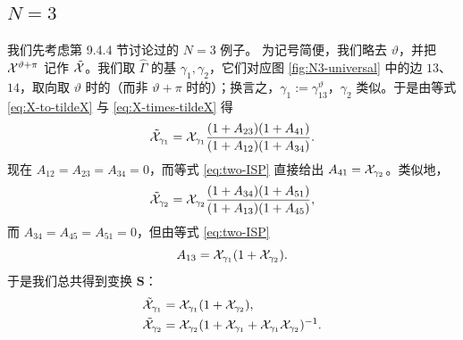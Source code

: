 \subsection{$N=3$}

我们先考虑第 9.4.4 节讨论过的 $N=3$ 例子。%
为记号简便，我们略去 $\vartheta$，并把 $\mathcal{X}^{\vartheta+\pi}$ 记作 $\tilde{\mathcal{X}}$。我们取 $\hat\Gamma$ 的基 $\gamma_1,\gamma_2$，它们对应图 \ref{fig:N3-universal} 中的边 $13$、$14$，取向取 $\vartheta$ 时的（而非 $\vartheta+\pi$ 时的）；换言之，$\gamma_1:=\gamma_{13}^\vartheta$，$\gamma_2$ 类似。于是由等式 \eqref{eq:X-to-tildeX} 与 \eqref{eq:X-times-tildeX} 得
\begin{equation}
\tilde{\mathcal{X}}_{\gamma_1}=\mathcal{X}_{\gamma_1}\frac{(1+A_{23})(1+A_{41})}{(1+A_{12})(1+A_{34})}.
\end{equation}
现在 $A_{12}=A_{23}=A_{34}=0$，而等式 \eqref{eq:two-ISP} 直接给出 $A_{41}=\mathcal{X}_{\gamma_2}$。类似地，
\begin{equation}
\tilde{\mathcal{X}}_{\gamma_2}=\mathcal{X}_{\gamma_2}\frac{(1+A_{34})(1+A_{51})}{(1+A_{13})(1+A_{45})},
\end{equation}
而 $A_{34}=A_{45}=A_{51}=0$，但由等式 \eqref{eq:two-ISP}
\begin{equation}
A_{13}=\mathcal{X}_{\gamma_1}(1+\mathcal{X}_{\gamma_2}).
\end{equation}
于是我们总共得到变换 $\mathbf S$：
\begin{align}
\tilde{\mathcal{X}}_{\gamma_1}&=\mathcal{X}_{\gamma_1}(1+\mathcal{X}_{\gamma_2}),\label{eq:n31}\\
\tilde{\mathcal{X}}_{\gamma_2}&=\mathcal{X}_{\gamma_2}(1+\mathcal{X}_{\gamma_1}+\mathcal{X}_{\gamma_1}\mathcal{X}_{\gamma_2})^{-1}.\label{eq:n32}
\end{align}



